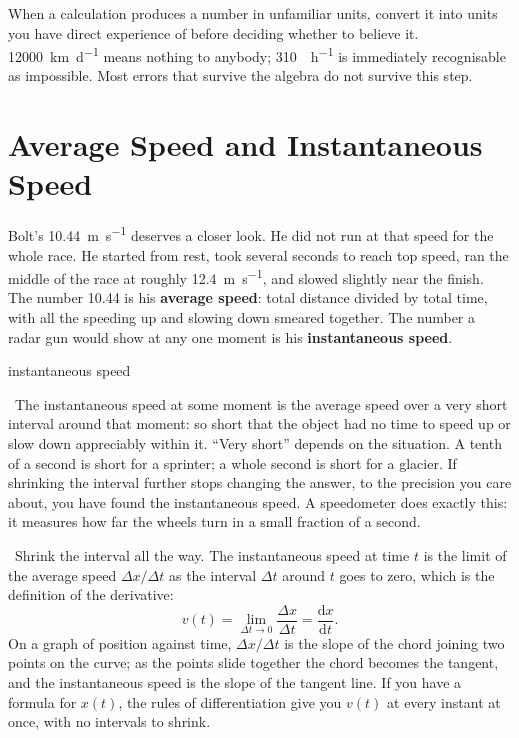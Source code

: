 \documentclass[11pt,twoside,openany]{book}
\newcommand{\dd}{\mathrm{d}}
\newcommand{\deriv}[2]{\frac{\dd #1}{\dd #2}}
\newcommand{\viewtag}[3]{\fcolorbox{#2}{#3}{\footnotesize\textbf{\textcolor{#2}{#1}}}}
\newcommand{\elemtag}{\viewtag{Elementary}{elemcol}{elempale}}
\newcommand{\calctag}{\viewtag{Calculus}{calccol}{calcpale}}
\newcommand{\elem}{\par\medskip\noindent\elemtag\ }
\newcommand{\calc}{\par\medskip\noindent\calctag\ }
\begin{document}
\begin{keyidea}
When a calculation produces a number in unfamiliar units, convert it into units you have direct experience of before deciding whether to believe it. \SI{12000}{\kilo\metre\per\day} means nothing to anybody; \SI{310}{\mile\per\hour} is immediately recognisable as impossible. Most errors that survive the algebra do not survive this step.
\end{keyidea}

\section{Average Speed and Instantaneous Speed}
\label{sec:average}

Bolt's \SI{10.44}{\metre\per\second} deserves a closer look. He did not run at that speed for the whole race. He started from rest, took several seconds to reach top speed, ran the middle of the race at roughly \SI{12.4}{\metre\per\second}, and slowed slightly near the finish. The number \num{10.44} is his \textbf{average speed}: total distance divided by total time, with all the speeding up and slowing down smeared together. The number a radar gun would show at any one moment is his \textbf{instantaneous speed}.

\begin{twoviews}{instantaneous speed}
\elem The instantaneous speed at some moment is the average speed over a very short interval around that moment: so short that the object had no time to speed up or slow down appreciably within it. ``Very short'' depends on the situation. A tenth of a second is short for a sprinter; a whole second is short for a glacier. If shrinking the interval further stops changing the answer, to the precision you care about, you have found the instantaneous speed. A speedometer does exactly this: it measures how far the wheels turn in a small fraction of a second.

\calc Shrink the interval all the way. The instantaneous speed at time $t$ is the limit of the average speed $\Delta x/\Delta t$ as the interval $\Delta t$ around $t$ goes to zero, which is the definition of the derivative:
\[
v(t) = \lim_{\Delta t \to 0}\frac{\Delta x}{\Delta t} = \deriv{x}{t}.
\]
On a graph of position against time, $\Delta x/\Delta t$ is the slope of the chord joining two points on the curve; as the points slide together the chord becomes the tangent, and the instantaneous speed is the slope of the tangent line. If you have a formula for $x(t)$, the rules of differentiation give you $v(t)$ at every instant at once, with no intervals to shrink.
\end{twoviews}
\end{document}
